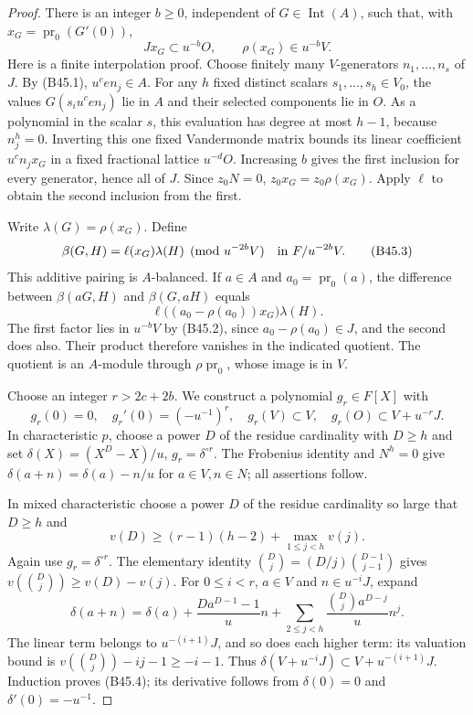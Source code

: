 \begin{proof}
There is an integer $b\ge0$, independent of
$G\in\operatorname{Int}(A)$, such that, with
$x_G=\operatorname{pr}_0(G'(0))$,
\[
                  Jx_G\subset u^{-b}O,\qquad
                  \rho(x_G)\in u^{-b}V.                   \tag{B45.2}
\]
Here is a finite interpolation proof. Choose finitely many
$V$-generators $n_1,\ldots,n_s$ of $J$. By (B45.1),
$u^c e n_j\in A$. For any $h$ fixed distinct scalars
$s_1,\ldots,s_h\in V_0$, the values
$G(s_i u^c e n_j)$ lie in $A$ and their selected components
lie in $O$. As a polynomial in the scalar $s$, this
evaluation has degree at most $h-1$, because $n_j^h=0$.
Inverting this one fixed Vandermonde matrix bounds its
linear coefficient $u^c n_jx_G$ in a fixed fractional
lattice $u^{-d}O$. Increasing $b$ gives the first inclusion
for every generator, hence all of $J$. Since $z_0N=0$,
$z_0x_G=z_0\rho(x_G)$. Apply $\ell$ to obtain the second
inclusion from the first.

Write $\lambda(G)=\rho(x_G)$. Define
\[
 \beta(G,H)=\ell(x_G)\lambda(H)\pmod {u^{-2b}V}
                         \quad\hbox{in }F/u^{-2b}V.
                                                               \tag{B45.3}
\]
This additive pairing is $A$-balanced. If $a\in A$ and
$a_0=\operatorname{pr}_0(a)$, the difference between
$\beta(aG,H)$ and $\beta(G,aH)$ equals
\[
 \ell\bigl((a_0-\rho(a_0))x_G\bigr)\lambda(H).
\]
The first factor lies in $u^{-b}V$ by (B45.2), since
$a_0-\rho(a_0)\in J$, and the second does also.
Their product therefore vanishes in the indicated quotient.
The quotient is an $A$-module through $\rho\operatorname{pr}_0$,
whose image is in $V$.

Choose an integer $r>2c+2b$. We construct a polynomial
$g_r\in F[X]$ with
\[
 g_r(0)=0,\quad g_r'(0)=(-u^{-1})^r,\quad
 g_r(V)\subset V,\quad g_r(O)\subset V+u^{-r}J.             \tag{B45.4}
\]
In characteristic $p$, choose a power $D$ of the residue
cardinality with $D\ge h$ and set
$\delta(X)=(X^D-X)/u$, $g_r=\delta^{\circ r}$.
The Frobenius identity and $N^h=0$ give
$\delta(a+n)=\delta(a)-n/u$ for $a\in V,n\in N$;
all assertions follow.

In mixed characteristic choose a power $D$ of the residue
cardinality so large that $D\ge h$ and
\[
 v(D)\ge (r-1)(h-2)+\max_{1\le j<h}v(j).
\]
Again use $g_r=\delta^{\circ r}$. The elementary identity
$\binom Dj=(D/j)\binom{D-1}{j-1}$ gives
$v(\binom Dj)\ge v(D)-v(j)$.
For $0\le i<r$, $a\in V$ and $n\in u^{-i}J$, expand
\[
 \delta(a+n)=\delta(a)+\frac{Da^{D-1}-1}{u}n
          +\sum_{2\le j<h}\frac{\binom Dj a^{D-j}}u n^j.
\]
The linear term belongs to $u^{-(i+1)}J$, and so does
each higher term: its valuation bound is
$v(\binom Dj)-ij-1\ge-i-1$.
Thus $\delta(V+u^{-i}J)\subset V+u^{-(i+1)}J$.
Induction proves (B45.4); its derivative follows from
$\delta(0)=0$ and $\delta'(0)=-u^{-1}$.


\end{proof}
